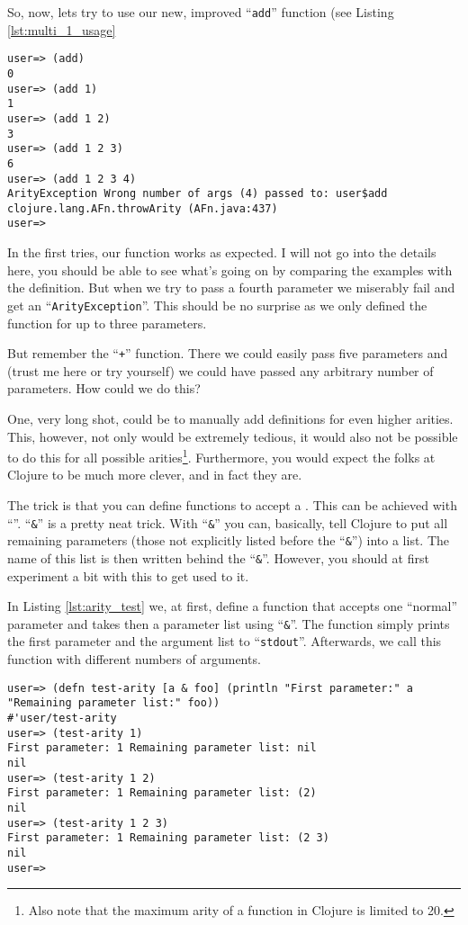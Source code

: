 So, now, lets try to use our new, improved ``\texttt{add}'' function (see Listing \vref{lst:multi_1_usage}

\begin{lstlisting}[label=lst:multi_1_usage, caption=Using our First Multi-arity Function]
user=> (add)
0
user=> (add 1)
1
user=> (add 1 2)
3
user=> (add 1 2 3)
6
user=> (add 1 2 3 4)
ArityException Wrong number of args (4) passed to: user$add  clojure.lang.AFn.throwArity (AFn.java:437)
user=>  
\end{lstlisting}

In the first tries, our function works as expected.
I will not go into the details here, you should be able to see what's going on by comparing the examples with the definition.
But when we try to pass a fourth parameter we miserably fail and get an ``\texttt{ArityException}''.
This should be no surprise as we only defined the function for up to three parameters.

But remember the ``\texttt{+}'' function.
There we could easily pass five parameters and (trust me here or try yourself) we could have passed any arbitrary number of parameters.
How could we do this?

One, very long shot, could be to manually add definitions for even higher arities.
This, however, not only would be extremely tedious, it would also not be possible to do this for all possible arities\footnote{Also note that the maximum arity of a function in Clojure is limited to 20.}.
Furthermore, you would expect the folks at Clojure to be much more clever, and in fact they are.

The trick is that you can define functions to accept a .
This can be achieved with ``\bfix{\&}''.
``\texttt{\&}'' is a pretty neat trick.
With ``\texttt{\&}'' you can, basically, tell Clojure to put all remaining parameters (those not explicitly listed before the ``\texttt{\&}'') into a list.
The name of this list is then written behind the ``\texttt{\&}''.
However, you should at first experiment a bit with this to get used to it.

In Listing \vref{lst:arity_test} we, at first, define a function that accepts one ``normal'' parameter and takes then a parameter list using ``\texttt{\&}''.
The function simply prints the first parameter and the argument list to ``\texttt{stdout}''.
Afterwards, we call this function with different numbers of arguments.

\begin{lstlisting}[label=lst:arity_test, caption=Testing Variable Length Parameters]
user=> (defn test-arity [a & foo] (println "First parameter:" a "Remaining parameter list:" foo))
#'user/test-arity
user=> (test-arity 1)
First parameter: 1 Remaining parameter list: nil
nil
user=> (test-arity 1 2)
First parameter: 1 Remaining parameter list: (2)
nil
user=> (test-arity 1 2 3)
First parameter: 1 Remaining parameter list: (2 3)
nil
user=>  
\end{lstlisting}

